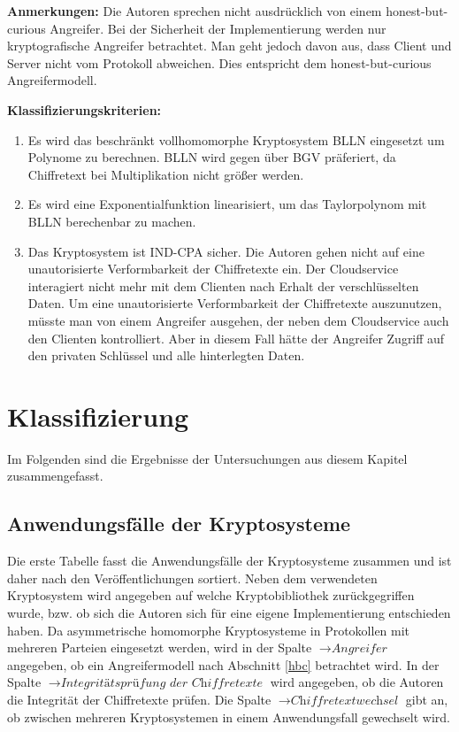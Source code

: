 \textbf{Anmerkungen:}
Die Autoren sprechen nicht ausdrücklich von einem honest-but-curious Angreifer. Bei der Sicherheit der Implementierung werden nur kryptografische Angreifer betrachtet. Man geht jedoch davon aus, dass Client und Server nicht vom Protokoll abweichen. Dies entspricht dem honest-but-curious Angreifermodell.

\textbf{Klassifizierungskriterien:}
\begin{enumerate}
	\item Es wird das beschränkt vollhomomorphe Kryptosystem BLLN eingesetzt um Polynome zu berechnen. BLLN wird gegen über BGV präferiert, da Chiffretext bei Multiplikation nicht größer werden. 
	\item Es wird eine Exponentialfunktion linearisiert, um das Taylorpolynom mit BLLN berechenbar zu machen.
	\item Das Kryptosystem ist IND-CPA sicher. Die Autoren gehen nicht auf eine unautorisierte Verformbarkeit der Chiffretexte ein. Der Cloudservice interagiert nicht mehr mit dem Clienten nach Erhalt der verschlüsselten Daten. Um eine unautorisierte Verformbarkeit der Chiffretexte auszunutzen, müsste man von einem Angreifer ausgehen, der neben dem Cloudservice auch den Clienten kontrolliert. Aber in diesem Fall hätte der Angreifer Zugriff auf den privaten Schlüssel und alle hinterlegten Daten. 
\end{enumerate}  

\section{Klassifizierung}
\label{klassSum}

Im Folgenden sind die Ergebnisse der Untersuchungen aus diesem Kapitel zusammengefasst.

\subsection{Anwendungsfälle der Kryptosysteme}
\label{EdK}

Die erste Tabelle fasst die Anwendungsfälle der Kryptosysteme zusammen und ist daher nach den Veröffentlichungen sortiert. Neben dem verwendeten Kryptosystem wird angegeben auf welche Kryptobibliothek zurückgegriffen wurde, bzw. ob sich die Autoren sich für eine eigene Implementierung entschieden haben. Da asymmetrische homomorphe Kryptosysteme in Protokollen mit mehreren Parteien eingesetzt werden, wird in der Spalte $\rightarrow\textit{Angreifer}$ angegeben, ob ein Angreifermodell nach Abschnitt \ref{hbc} betrachtet wird. In der Spalte  $\rightarrow\textit{Integritätsprüfung der Chiffretexte}$ wird angegeben, ob die Autoren die Integrität der Chiffretexte prüfen. Die Spalte $\rightarrow\textit{Chiffretextwechsel}$ gibt an, ob zwischen mehreren Kryptosystemen in einem Anwendungsfall gewechselt wird. 

